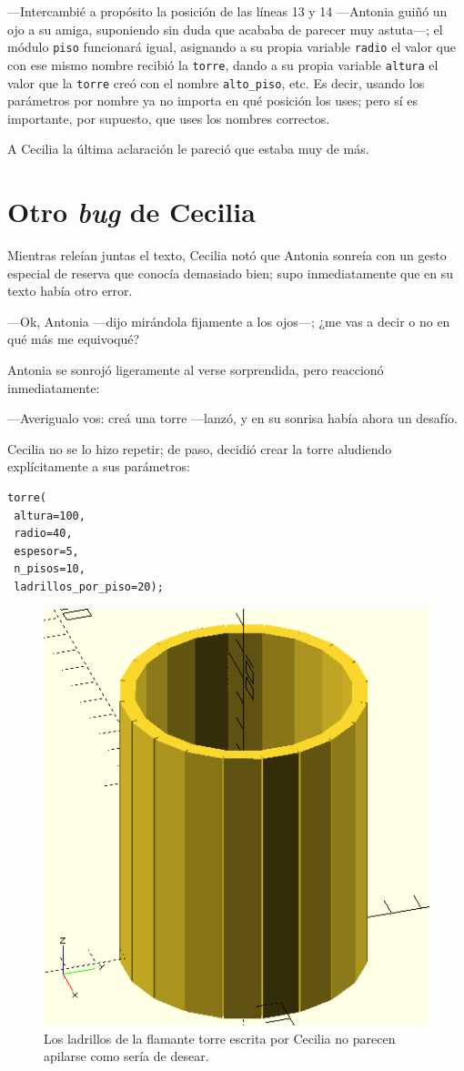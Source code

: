   
    ---Intercambié a propósito la posición de las líneas 13 y 14
    ---An\-to\-nia guiñó un ojo a su amiga, suponiendo sin duda que
    acababa de parecer muy astuta---; el módulo \texttt{piso}
    funcionará igual, asignando a su propia variable \texttt{radio} el
    valor que con ese mismo nombre recibió la \texttt{torre}, dando a
    su propia variable \texttt{altura} el valor que la \texttt{torre}
    creó con el nombre \texttt{alto\_piso}, etc. Es decir, usando los
    parámetros por nombre ya no importa en qué posición los uses; pero
    sí es importante, por supuesto, que uses los nombres correctos.

    A Cecilia la última aclaración le pareció que estaba muy de más.

  \section{Otro \emph{bug} de Cecilia} 
  
  Mientras releían juntas el texto, Cecilia notó que Antonia sonreía
  con un gesto especial de reserva que conocía demasiado bien; supo
  inmediatamente que en su texto había otro error.

  ---Ok, Antonia ---dijo mirándola fijamente a los ojos---; ¿me vas a
  decir o no en qué más me equivoqué?

  Antonia se sonrojó ligeramente al verse sorprendida, pero reaccionó
  inmediatamente:

  ---Averigualo vos: creá una torre ---lanzó, y en su sonrisa había
  ahora un desafío.

  Cecilia no se lo hizo repetir; de paso, decidió crear la torre
  aludiendo explícitamente a sus parámetros:

\begin{lstlisting}
torre(
 altura=100,
 radio=40,
 espesor=5,
 n_pisos=10,
 ladrillos_por_piso=20);
\end{lstlisting}

\begin{figure}[ht]
  \centering
  \includegraphics[width=.4\textwidth]{imagenes/torre-bug-1}  
  \caption{Los ladrillos de la flamante torre escrita por Cecilia no
    parecen apilarse como sería de desear.}
  \label{fig:torre-bug-1}
\end{figure}

